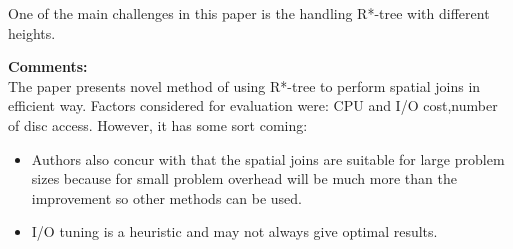 \documentclass[a4paper,12pt, twoside]{article}
\begin{document}
One of the main challenges in this paper is the handling R*-tree with different heights.

\textbf{Comments:}\\
The paper presents novel method of using R*-tree to perform spatial joins in efficient way. Factors considered for evaluation were: CPU and I/O cost,number of disc access. However, it has some sort coming:
\begin{itemize}
	\item Authors also concur with that the spatial joins are suitable for large problem sizes because for small problem overhead will be much more than the improvement so other methods can be used.
	
	\item I/O tuning is a heuristic and may not always give optimal results.

\end{itemize}
\end{document}
